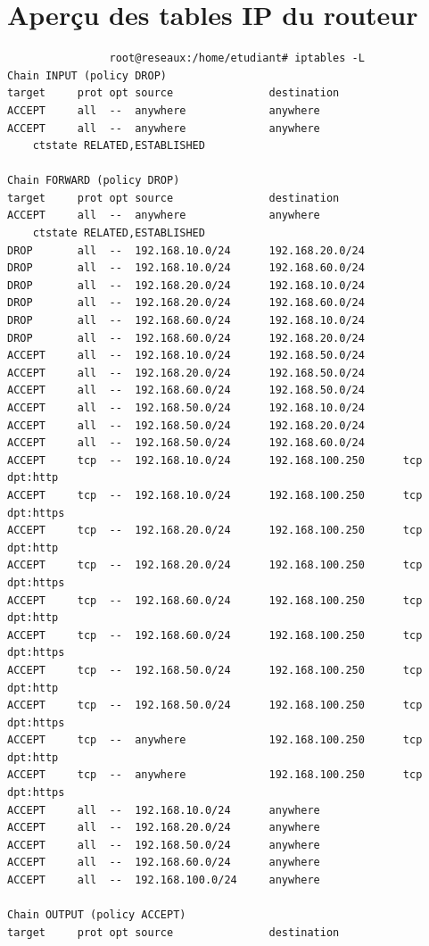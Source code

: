 \documentclass[a4paper,12pt,openany]{report}
\begin{document}
            \section{Aperçu des tables IP du routeur}
            \begin{verbatim}
                root@reseaux:/home/etudiant# iptables -L
Chain INPUT (policy DROP)
target     prot opt source               destination         
ACCEPT     all  --  anywhere             anywhere            
ACCEPT     all  --  anywhere             anywhere             
    ctstate RELATED,ESTABLISHED

Chain FORWARD (policy DROP)
target     prot opt source               destination         
ACCEPT     all  --  anywhere             anywhere             
    ctstate RELATED,ESTABLISHED
DROP       all  --  192.168.10.0/24      192.168.20.0/24     
DROP       all  --  192.168.10.0/24      192.168.60.0/24     
DROP       all  --  192.168.20.0/24      192.168.10.0/24     
DROP       all  --  192.168.20.0/24      192.168.60.0/24     
DROP       all  --  192.168.60.0/24      192.168.10.0/24     
DROP       all  --  192.168.60.0/24      192.168.20.0/24     
ACCEPT     all  --  192.168.10.0/24      192.168.50.0/24     
ACCEPT     all  --  192.168.20.0/24      192.168.50.0/24     
ACCEPT     all  --  192.168.60.0/24      192.168.50.0/24     
ACCEPT     all  --  192.168.50.0/24      192.168.10.0/24     
ACCEPT     all  --  192.168.50.0/24      192.168.20.0/24     
ACCEPT     all  --  192.168.50.0/24      192.168.60.0/24     
ACCEPT     tcp  --  192.168.10.0/24      192.168.100.250      tcp dpt:http
ACCEPT     tcp  --  192.168.10.0/24      192.168.100.250      tcp dpt:https
ACCEPT     tcp  --  192.168.20.0/24      192.168.100.250      tcp dpt:http
ACCEPT     tcp  --  192.168.20.0/24      192.168.100.250      tcp dpt:https
ACCEPT     tcp  --  192.168.60.0/24      192.168.100.250      tcp dpt:http
ACCEPT     tcp  --  192.168.60.0/24      192.168.100.250      tcp dpt:https
ACCEPT     tcp  --  192.168.50.0/24      192.168.100.250      tcp dpt:http
ACCEPT     tcp  --  192.168.50.0/24      192.168.100.250      tcp dpt:https
ACCEPT     tcp  --  anywhere             192.168.100.250      tcp dpt:http
ACCEPT     tcp  --  anywhere             192.168.100.250      tcp dpt:https
ACCEPT     all  --  192.168.10.0/24      anywhere            
ACCEPT     all  --  192.168.20.0/24      anywhere            
ACCEPT     all  --  192.168.50.0/24      anywhere            
ACCEPT     all  --  192.168.60.0/24      anywhere            
ACCEPT     all  --  192.168.100.0/24     anywhere            

Chain OUTPUT (policy ACCEPT)
target     prot opt source               destination         
            \end{verbatim}
\end{document}

